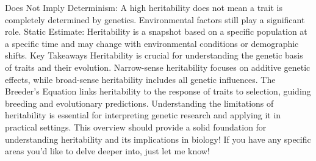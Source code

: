 Does Not Imply Determinism: A high heritability does not mean a trait is completely determined by genetics. Environmental factors still play a significant role.
Static Estimate: Heritability is a snapshot based on a specific population at a specific time and may change with environmental conditions or demographic shifts.
Key Takeaways
Heritability is crucial for understanding the genetic basis of traits and their evolution.
Narrow-sense heritability focuses on additive genetic effects, while broad-sense heritability includes all genetic influences.
The Breeder's Equation links heritability to the response of traits to selection, guiding breeding and evolutionary predictions.
Understanding the limitations of heritability is essential for interpreting genetic research and applying it in practical settings.
This overview should provide a solid foundation for understanding heritability and its implications in biology! If you have any specific areas you’d like to delve deeper into, just let me know!

